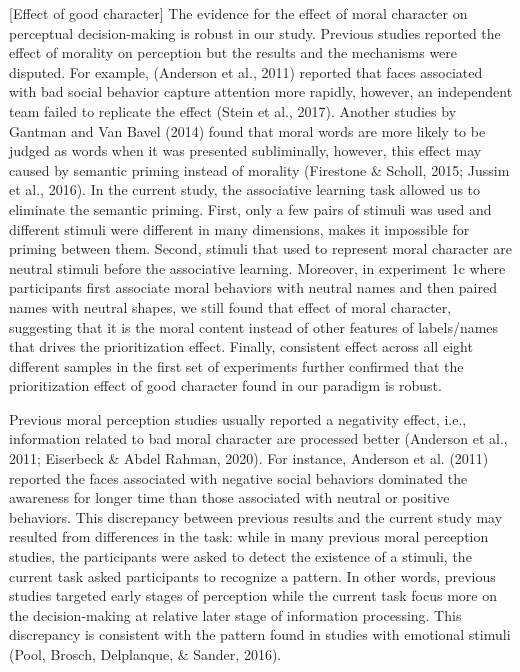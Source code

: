 \documentclass[
  man]{apa6}
\begin{document}
{[}Effect of good character{]} The evidence for the effect of moral character on perceptual decision-making is robust in our study. Previous studies reported the effect of morality on perception but the results and the mechanisms were disputed. For example, (Anderson et al., 2011) reported that faces associated with bad social behavior capture attention more rapidly, however, an independent team failed to replicate the effect (Stein et al., 2017). Another studies by Gantman and Van Bavel (2014) found that moral words are more likely to be judged as words when it was presented subliminally, however, this effect may caused by semantic priming instead of morality (Firestone \& Scholl, 2015; Jussim et al., 2016). In the current study, the associative learning task allowed us to eliminate the semantic priming. First, only a few pairs of stimuli was used and different stimuli were different in many dimensions, makes it impossible for priming between them. Second, stimuli that used to represent moral character are neutral stimuli before the associative learning. Moreover, in experiment 1c where participants first associate moral behaviors with neutral names and then paired names with neutral shapes, we still found that effect of moral character, suggesting that it is the moral content instead of other features of labels/names that drives the prioritization effect. Finally, consistent effect across all eight different samples in the first set of experiments further confirmed that the prioritization effect of good character found in our paradigm is robust.

Previous moral perception studies usually reported a negativity effect, i.e., information related to bad moral character are processed better (Anderson et al., 2011; Eiserbeck \& Abdel Rahman, 2020). For instance, Anderson et al. (2011) reported the faces associated with negative social behaviors dominated the awareness for longer time than those associated with neutral or positive behaviors. This discrepancy between previous results and the current study may resulted from differences in the task: while in many previous moral perception studies, the participants were asked to detect the existence of a stimuli, the current task asked participants to recognize a pattern. In other words, previous studies targeted early stages of perception while the current task focus more on the decision-making at relative later stage of information processing. This discrepancy is consistent with the pattern found in studies with emotional stimuli (Pool, Brosch, Delplanque, \& Sander, 2016).
\end{document}
